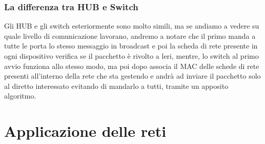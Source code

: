 \documentclass{book}
\begin{document}
\subsection{La differenza tra HUB e Switch}
Gli HUB e gli switch esteriormente sono molto simili, ma se andiamo a vedere su
quale livello di comunicazione lavorano, andremo a notare che il primo manda a
tutte le porta lo stesso messaggio in broadcast e poi la scheda di rete
presente in ogni dispositivo verifica se il pacchetto è rivolto a leri, mentre,
lo switch al primo avvio funziona allo stesso modo, ma poi dopo associa il MAC
delle schede di rete presenti all'interno della rete che sta gestendo e andrà
ad inviare il pacchetto solo al diretto interessato evitando di mandarlo a
tutti, tramite un apposito algoritmo.


\chapter{Applicazione delle reti}
\printindex
\end{document}
